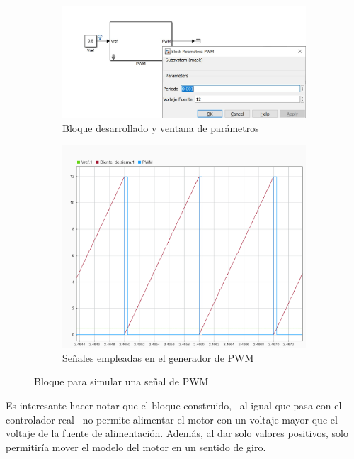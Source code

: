 \documentclass[10pt,a4paper]{report}
\begin{document}
\begin{figure}
\centering
\begin{subfigure}{0.5\textwidth}
\includegraphics[scale=0.3]{pwm_pr.jpg}
\caption{Bloque desarrollado y ventana de parámetros}
\label{f25a}
\end{subfigure}
\begin{subfigure}{0.5\textwidth}
\includegraphics[scale=0.5]{pwm_gen.png}
\caption{Señales empleadas en el generador de PWM}
\label{f25b}
\end{subfigure}
\caption{Bloque para simular una señal de PWM}
\end{figure}

Es interesante hacer notar que el bloque construido, --al igual que pasa con el controlador real-- no permite alimentar el motor con un voltaje mayor que el voltaje de la fuente de alimentación. Además, al dar solo valores positivos, solo permitiría mover el modelo del motor en un sentido de giro. 
\end{document}

